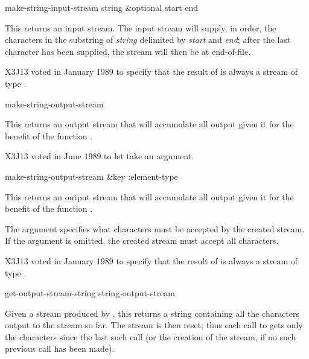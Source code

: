 \begin{defun}[Function]
make-string-input-stream string &optional start end

This returns an input stream.
The input stream will supply, in order, the characters in the substring
of {\it string} delimited by {\it start} and {\it end}; after the last
character has been supplied, the stream will then be at end-of-file.

\begin{new}
X3J13 voted in January 1989
to specify that the result of
 is always a stream of type .
\end{new}
\end{defun}

\begin{obsolete}
\begin{defun}[Function]
make-string-output-stream 

This returns an output stream that will 
accumulate all output given it for the benefit of the function
.
\end{defun}
\end{obsolete}

\begin{newer}
X3J13 voted in June 1989 
to let  take an  argument.

\begin{defun}[Function]
make-string-output-stream &key :element-type

This returns an output stream that will 
accumulate all output given it for the benefit of the function
.

The  argument specifies what characters
must be accepted by the created stream.  If the  argument
is omitted, the created stream must accept all characters.

X3J13 voted in January 1989
to specify that the result of
 is always a stream of type .
\end{defun}
\end{newer}


\begin{defun}[Function]
get-output-stream-string string-output-stream

Given a stream produced by , this
returns a string containing all the characters output to the stream so far.
The stream is then reset; thus each call to 
gets only the characters since the last such call (or the creation
of the stream, if no such previous call has been made).
\end{defun}


